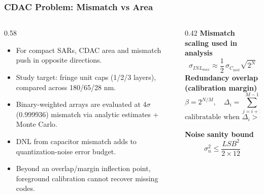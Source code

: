 \begin{frame}
  \frametitle{CDAC Problem: Mismatch vs Area}
  \small
  \begin{columns}
    \begin{column}{0.58\textwidth}
      \begin{itemize}
        \item For compact SARs, CDAC area and mismatch push in opposite directions.
        \item Study target: fringe unit caps (1/2/3 layers), compared across 180/65/28 nm.
        \item Binary-weighted arrays are evaluated at 4$\sigma$ (0.999936) mismatch via analytic estimates + Monte Carlo.
        \item DNL from capacitor mismatch adds to quantization-noise error budget.
        \item Beyond an overlap/margin inflection point, foreground calibration cannot recover missing codes.
      \end{itemize}
    \end{column}
    \begin{column}{0.42\textwidth}
      \tiny
      \textbf{Mismatch scaling used in analysis}
      \[
      \sigma_{INL_{max}} \approx \frac{1}{2}\,\sigma_{C_{unit}}\sqrt{2^N}
      \]
      \vspace{-0.8em}
      \textbf{Redundancy overlap (calibration margin)}
      \[
      \beta = 2^{N/M}, \quad
      \Delta_i = \sum_{j=i+1}^{M-1} W_j - W_i
      \]
      \vspace{-0.8em}
      \[
      \text{calibratable when } \Delta_i > 4\sigma_{\text{equiv},i}
      \]
      \vspace{-0.2em}

      \textbf{Noise sanity bound}
      \[
      \sigma_n^2 \le \frac{LSB^2}{2 \times 12}
      \]
    \end{column}
  \end{columns}
\end{frame}

